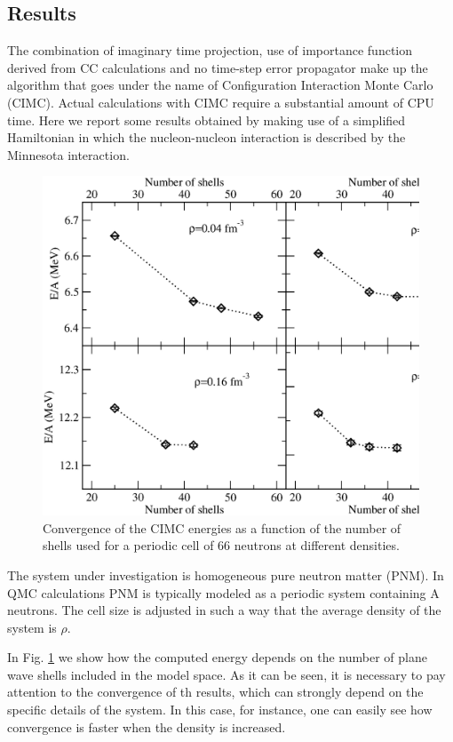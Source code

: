 \subsection{Results}
The combination of imaginary time projection, use of importance function derived from CC calculations and no time-step error propagator make up the algorithm that goes under the name of Configuration Interaction Monte Carlo (CIMC).
Actual calculations with CIMC require a substantial amount of CPU time. Here we report some results obtained by making use of a simplified Hamiltonian in which the nucleon-nucleon interaction is described by the Minnesota interaction.
\begin{figure}
	\begin{center}
		\includegraphics[scale=0.5]{Chapter9-figures/cimc_convergence.eps}
	\end{center}
	\caption{Convergence of the CIMC energies as a function of the number of shells used for a periodic cell of 66 neutrons at different densities.}
	\label{fig.cimc_conv}
\end{figure}
The system under investigation is homogeneous pure neutron matter (PNM). In QMC calculations PNM is typically modeled as a periodic system containing A neutrons. The cell size is adjusted in such a way that the average density of the system is $\rho$.

In Fig. \ref{fig.cimc_conv} we show how the computed energy depends on the number of plane wave shells included in the model space. As it can be seen, it is necessary to pay attention to the convergence of th results, which can strongly depend on the specific details of the system. In this case, for instance, one can easily see how convergence is faster when the density is increased. 

